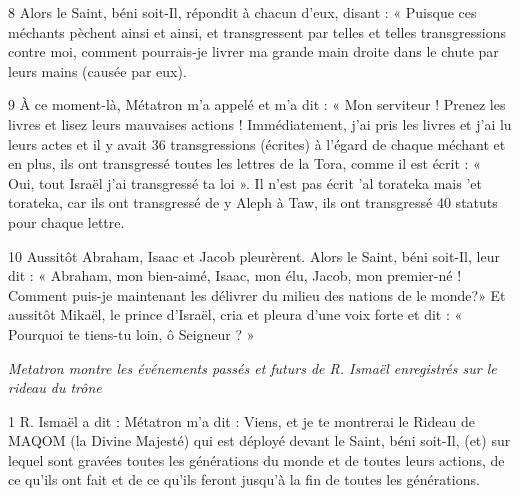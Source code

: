 \par 8 Alors le Saint, béni soit-Il, répondit à chacun d'eux, disant : « Puisque ces méchants pèchent ainsi et ainsi, et transgressent par telles et telles transgressions contre moi, comment pourrais-je livrer ma grande main droite dans le chute par leurs mains (causée par eux).

\par 9 À ce moment-là, Métatron m'a appelé et m'a dit : « Mon serviteur ! Prenez les livres et lisez leurs mauvaises actions ! Immédiatement, j'ai pris les livres et j'ai lu leurs actes et il y avait 36 ​​transgressions (écrites) à l'égard de chaque méchant et en plus, ils ont transgressé toutes les lettres de la Tora, comme il est écrit : « Oui, tout Israël j’ai transgressé ta loi ». Il n'est pas écrit 'al torateka mais 'et torateka, car ils ont transgressé de y Aleph à Taw, ils ont transgressé 40 statuts pour chaque lettre.

\par 10 Aussitôt Abraham, Isaac et Jacob pleurèrent. Alors le Saint, béni soit-Il, leur dit : « Abraham, mon bien-aimé, Isaac, mon élu, Jacob, mon premier-né ! Comment puis-je maintenant les délivrer du milieu des nations de le monde?» Et aussitôt Mikaël, le prince d'Israël, cria et pleura d'une voix forte et dit : « Pourquoi te tiens-tu loin, ô Seigneur ? »



\par \textit{Metatron montre les événements passés et futurs de R. Ismaël enregistrés sur le rideau du trône}

\par 1 R. Ismaël a dit : Métatron m'a dit : Viens, et je te montrerai le Rideau de MAQOM (la Divine Majesté) qui est déployé devant le Saint, béni soit-Il, (et) sur lequel sont gravées toutes les générations du monde et de toutes leurs actions, de ce qu'ils ont fait et de ce qu'ils feront jusqu'à la fin de toutes les générations.

